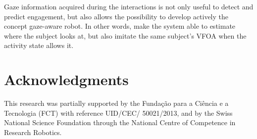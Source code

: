 \documentclass{sig-alternate}
\begin{document}
Gaze information acquired during the interactions is not only useful to detect
and predict engagement, but also allows the possibility to develop actively the
concept gaze-aware robot. In other words, make the system able to estimate where
the subject looks at, but also imitate the same subject's VFOA when the activity
state allows it. 

\section*{Acknowledgments}

This research was partially supported by the Funda\c{c}\~{a}o para a Ci\^{e}ncia
e a Tecnologia (FCT) with reference UID/CEC/ 50021/2013, and by the Swiss
National Science Foundation through the National Centre of Competence in
Research Robotics.



\end{document}
